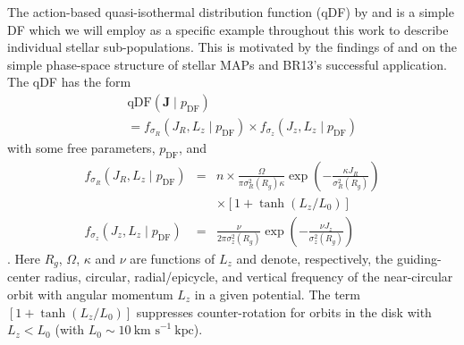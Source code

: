 \documentclass[iop,revtex4,numberedappendix,appendixfloats]{emulateapj}
\newcommand{\vect}[1]{\boldsymbol{#1}}
\newcommand{\MAPs}{MAPs}
\begin{document}
The action-based quasi-isothermal distribution function (qDF) by \citet{2010MNRAS.401.2318B} and \citet{2011MNRAS.413.1889B} is a simple DF which we will employ as a specific example throughout this work to describe individual stellar sub-populations. This is motivated by the findings of \citet{2012ApJ...751..131B,2012ApJ...755..115B,2012ApJ...753..148B} and \citet{2013MNRAS.434..652T} on the simple phase-space structure of stellar \MAPs{} and BR13's successful application. The qDF has the form
\begin{eqnarray}
&&\text{qDF}(\vect{J} \mid p_\text{DF}) \nonumber\\
&&= f_{\sigma_R}\left(J_R,L_z \mid p_\text{DF}\right) \times f_{\sigma_z}\left(J_z,L_z \mid p_\text{DF}\right)\label{eq:df_general}\end{eqnarray}
with some free parameters, $p_\text{DF}$, and
\begin{eqnarray}
f_{\sigma_R}\left(J_R,L_z \mid p_\text{DF}\right) &=& n \times \frac{\Omega}{\pi\sigma_R^2(R_g) \kappa}\exp\left(-\frac{\kappa J_R}{\sigma_R^2(R_g)} \right) \nonumber\\
&& \times \left[1+\tanh\left(L_z/L_0\right) \right]\\
f_{\sigma_z}\left(J_z,L_z \mid p_\text{DF} \right) &=& \frac{\nu}{2 \pi \sigma_z^2(R_g)} \exp\left( -\frac{\nu J_z}{\sigma_z^2(R_g)} \right)
\end{eqnarray}
\citep{2011MNRAS.413.1889B}. Here $R_g$, $\Omega$, $\kappa$ and $\nu$ are functions of $L_z$ and denote, respectively, the guiding-center radius, circular, radial/epicycle, and vertical frequency of the near-circular orbit with angular momentum $L_z$ in a given potential. The term $\left[1+\tanh\left(L_z/L_0\right) \right]$ suppresses counter-rotation for orbits in the disk with $L_z < L_0$ (with $L_0 \sim 10~\text{km s}^{-1}~ \text{kpc}$).
\end{document}
